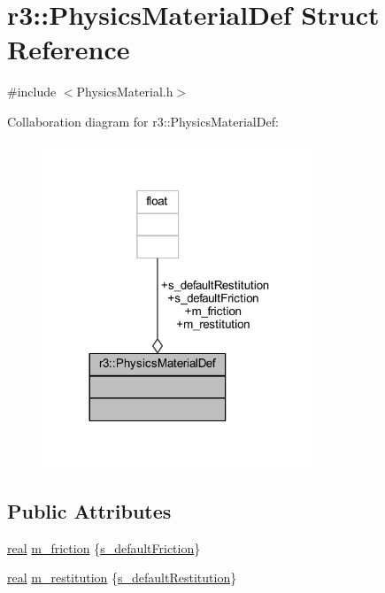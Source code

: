 \hypertarget{structr3_1_1_physics_material_def}{}\section{r3\+:\+:Physics\+Material\+Def Struct Reference}
\label{structr3_1_1_physics_material_def}


{\ttfamily \#include $<$Physics\+Material.\+h$>$}



Collaboration diagram for r3\+:\+:Physics\+Material\+Def\+:\nopagebreak
\begin{figure}[H]
\begin{center}
\leavevmode
\includegraphics[width=233pt]{structr3_1_1_physics_material_def__coll__graph}
\end{center}
\end{figure}
\subsection*{Public Attributes}
\begin{DoxyCompactItemize}
\item 
\mbox{\hyperlink{namespacer3_ab2016b3e3f743fb735afce242f0dc1eb}{real}} \mbox{\hyperlink{structr3_1_1_physics_material_def_aef82d9585791c1470ab92c6efa57b1b9}{m\+\_\+friction}} \{\mbox{\hyperlink{structr3_1_1_physics_material_def_a491a5e29b693bd20a7a8708f13c7f473}{s\+\_\+default\+Friction}}\}
\item 
\mbox{\hyperlink{namespacer3_ab2016b3e3f743fb735afce242f0dc1eb}{real}} \mbox{\hyperlink{structr3_1_1_physics_material_def_abf6dd41075d432324d9524e18f041a87}{m\+\_\+restitution}} \{\mbox{\hyperlink{structr3_1_1_physics_material_def_a994308068cb88f266dd5f9f63f320add}{s\+\_\+default\+Restitution}}\}
\end{DoxyCompactItemize}
